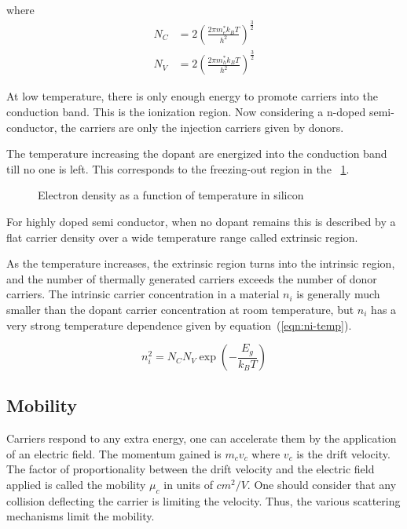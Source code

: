 where 
\begin{align}
\label{eqn:number_intrisinc}
N_C &= 2 {\left( \frac{2\pi m_e^* k_B T}{h^2} \right)}^{\frac{3}{2}}\\
N_V &= 2 {\left( \frac{2\pi m_h^* k_B T}{h^2} \right)}^{\frac{3}{2}}
\end{align}

At low temperature, there is only enough energy to promote carriers into the conduction band. This is the ionization region. Now considering a n-doped semi-conductor, the carriers are only the injection carriers given by donors.

The temperature increasing the dopant are energized into the conduction band till no one is left. This corresponds to the freezing-out region in the \figurename~\ref{fig:electron_density}.

\begin{figure}[!ht]
    \centering
    
    \caption{Electron density as a function of temperature in silicon}
    \label{fig:electron_density}
\end{figure}

For highly doped semi conductor, when no dopant remains this is described by a flat carrier density over a wide temperature range called extrinsic region.

As the temperature increases, the extrinsic region turns into the intrinsic region, and the number of thermally generated carriers exceeds the number of donor carriers. The intrinsic carrier concentration in a material \(n_i \) is generally much smaller than the dopant carrier concentration at room temperature, but \(n_i \) has a very strong temperature dependence given by equation~(\ref{eqn:ni-temp}).

\begin{equation}
\label{eqn:ni-temp}
n_i^2 = N_C N_V \exp\left( -\frac{E_g}{k_B T} \right) 
\end{equation}

\subsection{Mobility}               %
\label{sec:mobility}
Carriers respond to any extra energy, one can accelerate them by the application of an electric field. The momentum gained is \(m_c v_c \) where \(v_c \) is the drift velocity. The factor of proportionality between the drift velocity and the electric field applied is called the mobility \(\mu_c \) in units of \(cm^2/V \). One should consider that any collision deflecting the carrier is limiting the velocity. Thus, the various scattering mechanisms limit the mobility.

